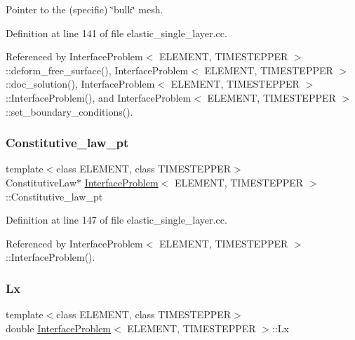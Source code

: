 Pointer to the (specific) \char`\"{}bulk\char`\"{} mesh. 



Definition at line 141 of file elastic\+\_\+single\+\_\+layer.\+cc.



Referenced by Interface\+Problem$<$ E\+L\+E\+M\+E\+N\+T, T\+I\+M\+E\+S\+T\+E\+P\+P\+E\+R $>$\+::deform\+\_\+free\+\_\+surface(), Interface\+Problem$<$ E\+L\+E\+M\+E\+N\+T, T\+I\+M\+E\+S\+T\+E\+P\+P\+E\+R $>$\+::doc\+\_\+solution(), Interface\+Problem$<$ E\+L\+E\+M\+E\+N\+T, T\+I\+M\+E\+S\+T\+E\+P\+P\+E\+R $>$\+::\+Interface\+Problem(), and Interface\+Problem$<$ E\+L\+E\+M\+E\+N\+T, T\+I\+M\+E\+S\+T\+E\+P\+P\+E\+R $>$\+::set\+\_\+boundary\+\_\+conditions().

\mbox{\label{classInterfaceProblem_a5bf645cbdbf7775ab6438be324caf3c3}} 
\subsubsection{\texorpdfstring{Constitutive\+\_\+law\+\_\+pt}{Constitutive\_law\_pt}}
{\footnotesize\ttfamily template$<$class E\+L\+E\+M\+E\+NT, class T\+I\+M\+E\+S\+T\+E\+P\+P\+ER$>$ \\
Constitutive\+Law$\ast$ \hyperlink{classInterfaceProblem}{Interface\+Problem}$<$ E\+L\+E\+M\+E\+NT, T\+I\+M\+E\+S\+T\+E\+P\+P\+ER $>$\+::Constitutive\+\_\+law\+\_\+pt\hspace{0.3cm}{\ttfamily [private]}}



Definition at line 147 of file elastic\+\_\+single\+\_\+layer.\+cc.



Referenced by Interface\+Problem$<$ E\+L\+E\+M\+E\+N\+T, T\+I\+M\+E\+S\+T\+E\+P\+P\+E\+R $>$\+::\+Interface\+Problem().

\mbox{\label{classInterfaceProblem_a9b5070b479a79546b983bd7027917e93}} 
\subsubsection{\texorpdfstring{Lx}{Lx}}
{\footnotesize\ttfamily template$<$class E\+L\+E\+M\+E\+NT, class T\+I\+M\+E\+S\+T\+E\+P\+P\+ER$>$ \\
double \hyperlink{classInterfaceProblem}{Interface\+Problem}$<$ E\+L\+E\+M\+E\+NT, T\+I\+M\+E\+S\+T\+E\+P\+P\+ER $>$\+::Lx\hspace{0.3cm}{\ttfamily [private]}}



